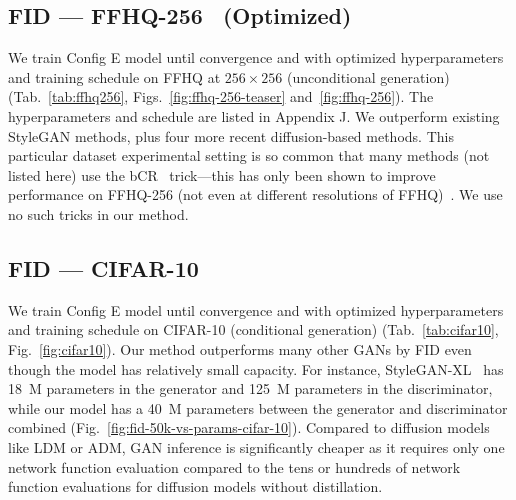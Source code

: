 \subsection{FID --- FFHQ-256\texorpdfstring{~\cite{sg1}}{} (Optimized)}
\vspace{-0.1cm}
We train Config E model until convergence and with optimized hyperparameters and training schedule on FFHQ at $256 \times 256$ (unconditional generation) (Tab.~\ref{tab:ffhq256}, Figs.~\ref{fig:ffhq-256-teaser} and~\ref{fig:ffhq-256}). The hyperparameters and schedule are listed in Appendix J. We outperform existing StyleGAN methods, plus four more recent diffusion-based methods. This particular dataset experimental setting is so common that many methods (not listed here) use the bCR~\cite{zhao2021improved} trick---this has only been shown to improve performance on FFHQ-256 (not even at different resolutions of FFHQ)~\cite{zhao2021improved, zhang2022styleswin}. We use no such tricks in our method.



\subsection{FID --- CIFAR-10~\cite{krizhevsky2009learning}} \vspace{-0.1cm}
We train Config E model until convergence and with optimized hyperparameters and training schedule on CIFAR-10 (conditional generation) (Tab.~\ref{tab:cifar10}, Fig.~\ref{fig:cifar10}). Our method outperforms many other GANs by FID even though the model has relatively small capacity. For instance, StyleGAN-XL~\cite{sgxl} has 18\ M parameters in the generator and 125\ M parameters in the discriminator, while our model has a 40\ M parameters between the generator and discriminator combined (Fig.~\ref{fig:fid-50k-vs-params-cifar-10}). Compared to diffusion models like LDM or ADM, GAN inference is significantly cheaper as it requires only one network function evaluation compared to the tens or hundreds of network function evaluations for diffusion models without distillation. 

